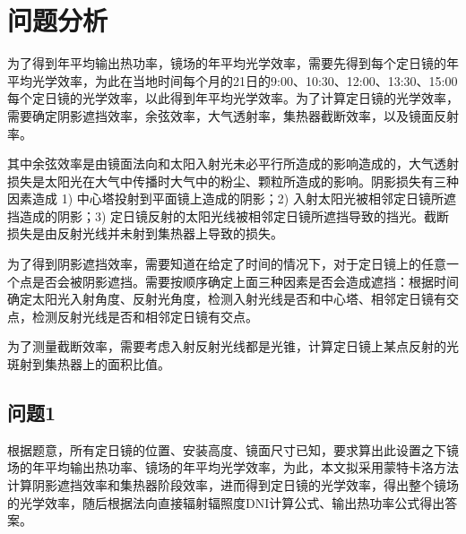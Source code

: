 \section{问题分析}
为了得到年平均输出热功率，镜场的年平均光学效率，需要先得到每个定日镜的年平均光学效率，为此在当地时间每个月的21日的9:00、10:30、12:00、13:30、15:00每个定日镜的光学效率，以此得到年平均光学效率。为了计算定日镜的光学效率，需要确定阴影遮挡效率，余弦效率，大气透射率，集热器截断效率，以及镜面反射率。

其中余弦效率是由镜面法向和太阳入射光未必平行所造成的影响造成的，大气透射损失是太阳光在大气中传播时大气中的粉尘、颗粒所造成的影响。阴影损失有三种因素造成 1) 中心塔投射到平面镜上造成的阴影；2) 入射太阳光被相邻定日镜所遮挡造成的阴影；3) 定日镜反射的太阳光线被相邻定日镜所遮挡导致的挡光。截断损失是由反射光线并未射到集热器上导致的损失。

为了得到阴影遮挡效率，需要知道在给定了时间的情况下，对于定日镜上的任意一个点是否会被阴影遮挡。需要按顺序确定上面三种因素是否会造成遮挡：根据时间确定太阳光入射角度、反射光角度，检测入射光线是否和中心塔、相邻定日镜有交点，检测反射光线是否和相邻定日镜有交点。

为了测量截断效率，需要考虑入射反射光线都是光锥，计算定日镜上某点反射的光斑射到集热器上的面积比值。
\subsection{问题1}

根据题意，所有定日镜的位置、安装高度、镜面尺寸已知，要求算出此设置之下镜场的年平均输出热功率、镜场的年平均光学效率，为此，本文拟采用蒙特卡洛方法计算阴影遮挡效率和集热器阶段效率，进而得到定日镜的光学效率，得出整个镜场的光学效率，随后根据法向直接辐射辐照度DNI计算公式、输出热功率公式得出答案。
